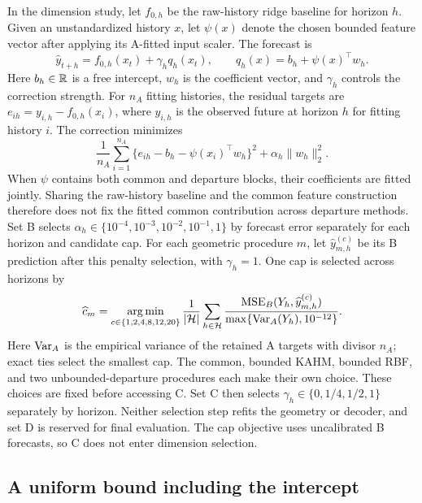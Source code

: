 In the dimension study, let $f_{0,h}$ be the raw-history ridge baseline
for horizon $h$. Given
an unstandardized history $x$, let $\psi(x)$ denote the chosen bounded
feature vector after applying its A-fitted input scaler. The forecast is
\begin{equation}
 \widehat y_{t+h}=f_{0,h}(x_t)+\gamma_h q_h(x_t),\qquad
 q_h(x)=b_h+\psi(x)^\top w_h.
 \label{eq:mechanism-main-forecast}
\end{equation}
Here $b_h\in\mathbb{R}$ is a free intercept, $w_h$ is the coefficient vector,
and $\gamma_h$ controls the correction strength. For $n_A$ fitting
histories, the residual targets are
$e_{ih}=y_{i,h}-f_{0,h}(x_i)$, where $y_{i,h}$ is the observed future
at horizon $h$ for fitting history $i$. The correction minimizes
\[
 \frac1{n_A}\sum_{i=1}^{n_A}
       \{e_{ih}-b_h-\psi(x_i)^\top w_h\}^2
       +\alpha_h\|w_h\|_2^2.
\]
When $\psi$ contains both common and departure blocks, their coefficients
are fitted jointly. Sharing the raw-history baseline and the common
feature construction therefore does not fix the fitted common
contribution across departure methods.
Set B selects $\alpha_h\in\{10^{-4},10^{-3},10^{-2},10^{-1},1\}$
by forecast error separately for each horizon and candidate cap.
For each geometric procedure $m$, let $\widehat y^{(c)}_{m,h}$ be its
B prediction after this penalty selection, with $\gamma_h=1$. One cap
is selected across horizons by
\begin{equation}
 \widehat c_m=\mathop{\arg\min}_{c\in\{1,2,4,8,12,20\}}
 \frac1{|\mathcal H|}\sum_{h\in\mathcal H}
 \frac{\operatorname{MSE}_B(Y_h,\widehat y^{(c)}_{m,h})}
 {\max\{\operatorname{Var}_A(Y_h),10^{-12}\}}.
 \label{eq:dimension-cap-selection}
\end{equation}
Here $\operatorname{Var}_A$ is the empirical variance of the retained A targets with
divisor $n_A$; exact ties select the smallest cap. The common, bounded
KAHM, bounded RBF, and two unbounded-departure procedures each make
their own choice. These choices are fixed before accessing C.
Set C then selects $\gamma_h\in\{0,1/4,1/2,1\}$ separately by
horizon. Neither selection step refits the geometry or decoder, and
set D is reserved for final evaluation. The cap objective uses
uncalibrated B forecasts, so C does not enter dimension selection.

\subsection{A uniform bound including the intercept}

